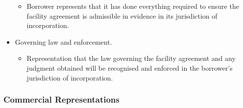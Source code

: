 \documentclass[
]{article}
\providecommand{\tightlist}{%
  \setlength{\itemsep}{0pt}\setlength{\parskip}{0pt}}
\begin{document}
\begin{itemize}
  \begin{itemize}
  \tightlist
  \item
    Borrower represents that it has done everything required to ensure
    the facility agreement is admissible in evidence in its jurisdiction
    of incorporation.
  \end{itemize}
\item
  Governing law and enforcement.

  \begin{itemize}
  \tightlist
  \item
    Representation that the law governing the facility agreement and any
    judgment obtained will be recognised and enforced in the borrower's
    jurisdiction of incorporation.
  \end{itemize}
\end{itemize}

\hypertarget{commercial-representations}{%
\subsubsection{Commercial
Representations}\label{commercial-representations}}
\end{document}
